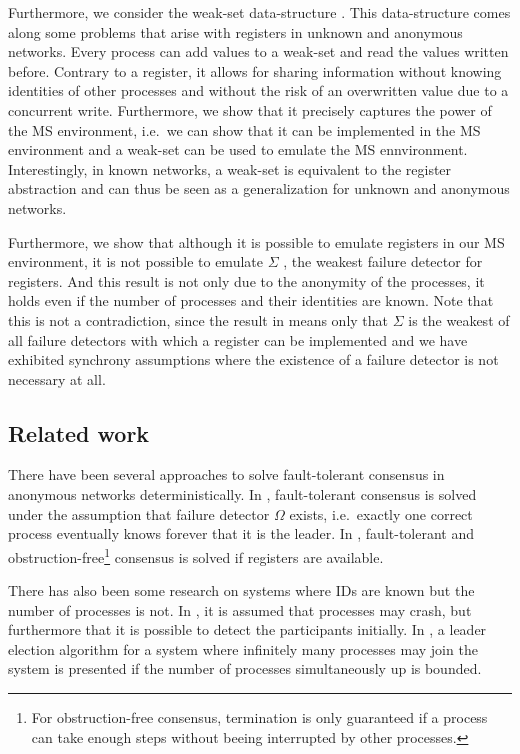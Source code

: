 \documentclass[conference, compsoc]{IEEEtran}
\begin{document}
Furthermore, we consider the weak-set data-structure \cite{DF}. This data-structure comes along some problems that arise with registers in unknown and anonymous networks. Every process can add values to a weak-set and read the values written before. Contrary to a register, it allows for sharing information without knowing identities of other processes and without the risk of an overwritten value due to a concurrent write. Furthermore, we show that it precisely captures the power of the MS environment, i.e.~we can show that it can be implemented in the MS environment and a weak-set can be used to emulate the MS ennvironment. Interestingly, in known networks, a weak-set is equivalent to the register abstraction and can thus be seen as a generalization for unknown and anonymous networks.     

Furthermore, we show that although it is possible to emulate registers in our MS environment, it is not possible to emulate $\Sigma$ \cite{200377/IC}, the weakest failure detector for registers. And this result is not only due to the anonymity of the processes, it holds even if the number of processes and their identities are known. Note that this is not a contradiction, since the result in \cite{200377/IC} means only that $\Sigma$ is the weakest of all failure detectors with which a register can be implemented and we have exhibited synchrony assumptions where the existence of a failure detector is not necessary at all.

\subsection{Related work}

There have been several approaches to solve fault-tolerant consensus in anonymous networks deterministically. In \cite{DF}, fault-tolerant consensus is solved under the assumption that failure detector $\Omega$ \cite{journals/jacm/ChandraHT96} exists, i.e.~exactly one correct process eventually knows forever that it is the leader.    
In \cite{DBLP:journals/dc/GuerraouiR07}, fault-tolerant and obstruction-free\footnote{For obstruction-free consensus, termination is only guaranteed if a process can take enough steps without beeing interrupted by other processes.} consensus is solved if registers are available.


There has also been some research on systems where IDs are known but the number of processes is not. In \cite{1253054}, it is assumed that processes may crash, but furthermore that it is possible to detect the participants initially. In \cite{1432337}, a leader election algorithm for a system where infinitely many processes may join the system is presented if the number of processes simultaneously up is bounded.
\end{document}
